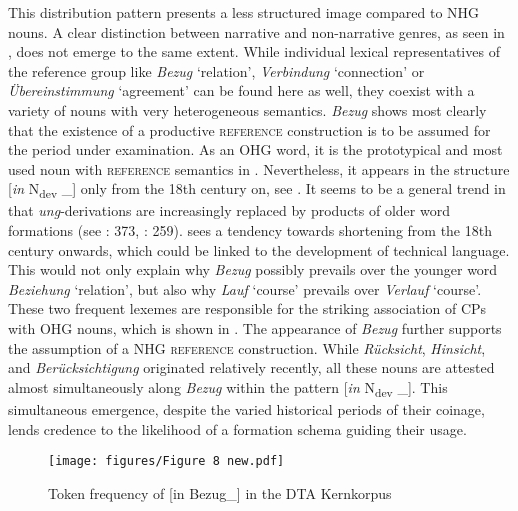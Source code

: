 \documentclass[output=paper,colorlinks,citecolor=brown]{langscibook}
\begin{document}
This distribution pattern presents a less structured image compared to NHG nouns. A clear distinction between narrative and non-narrative genres, as seen in , does not emerge to the same extent. While individual lexical representatives of the reference group like \textit{Bezug} ‘relation', \textit{Verbindung} ‘connection' or \textit{Übereinstimmung} ‘agreement' can be found here as well, they coexist with a variety of nouns with very heterogeneous semantics. \textit{Bezug} shows most clearly that the existence of a productive \textsc{reference} construction is to be assumed for the period under examination. As an OHG word, it is the prototypical and most used noun with \textsc{reference} semantics in . Nevertheless, it appears in the structure [\textit{in} N\textsubscript{dev} \_] only from the 18th century on, see . It seems to be a general trend in  that \textit{ung}{}-derivations are increasingly replaced by products of older word formations (see \citealt{Demske2000}: 373, \citealt{Hartmann2016}: 259). \citet[153]{Schmidt2007} sees a tendency towards shortening from the 18th century onwards, which could be linked to the development of technical language. This would not only explain why \textit{Bezug} possibly prevails over the younger word \textit{Beziehung} ‘relation', but also why \textit{Lauf} ‘course’ prevails over \textit{Verlauf}  ‘course’. These two frequent lexemes are responsible for the striking association of CPs with OHG nouns, which is shown in . The appearance of \textit{Bezug} further supports the assumption of a NHG \textsc{reference} construction. While \textit{Rücksicht}, \textit{Hinsicht}, and \textit{Berücksichtigung} originated relatively recently, all these nouns are attested almost simultaneously along \textit{Bezug} within the pattern [\textit{in} N\textsubscript{dev} \_]. This simultaneous emergence, despite the varied historical periods of their coinage, lends credence to the likelihood of a formation schema guiding their usage.

\begin{figure}
     \texttt{[image: figures/Figure 8 new.pdf]}
     \caption{Token frequency of [in Bezug\_] in the DTA Kernkorpus}
     \label{fig:fleissner:8}
\end{figure}
\end{document}
